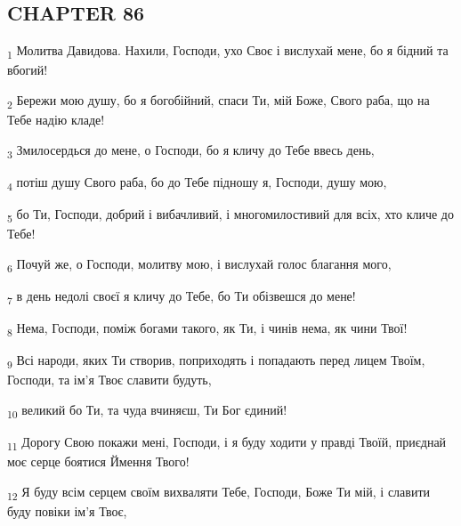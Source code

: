 \subsection{CHAPTER 86}
\begin{tcolorbox}
\textsubscript{1} Молитва Давидова. Нахили, Господи, ухо Своє і вислухай мене, бо я бідний та вбогий!
\end{tcolorbox}
\begin{tcolorbox}
\textsubscript{2} Бережи мою душу, бо я богобійний, спаси Ти, мій Боже, Свого раба, що на Тебе надію кладе!
\end{tcolorbox}
\begin{tcolorbox}
\textsubscript{3} Змилосердься до мене, о Господи, бо я кличу до Тебе ввесь день,
\end{tcolorbox}
\begin{tcolorbox}
\textsubscript{4} потіш душу Свого раба, бо до Тебе підношу я, Господи, душу мою,
\end{tcolorbox}
\begin{tcolorbox}
\textsubscript{5} бо Ти, Господи, добрий і вибачливий, і многомилостивий для всіх, хто кличе до Тебе!
\end{tcolorbox}
\begin{tcolorbox}
\textsubscript{6} Почуй же, о Господи, молитву мою, і вислухай голос благання мого,
\end{tcolorbox}
\begin{tcolorbox}
\textsubscript{7} в день недолі своєї я кличу до Тебе, бо Ти обізвешся до мене!
\end{tcolorbox}
\begin{tcolorbox}
\textsubscript{8} Нема, Господи, поміж богами такого, як Ти, і чинів нема, як чини Твої!
\end{tcolorbox}
\begin{tcolorbox}
\textsubscript{9} Всі народи, яких Ти створив, поприходять і попадають перед лицем Твоїм, Господи, та ім'я Твоє славити будуть,
\end{tcolorbox}
\begin{tcolorbox}
\textsubscript{10} великий бо Ти, та чуда вчиняєш, Ти Бог єдиний!
\end{tcolorbox}
\begin{tcolorbox}
\textsubscript{11} Дорогу Свою покажи мені, Господи, і я буду ходити у правді Твоїй, приєднай моє серце боятися Ймення Твого!
\end{tcolorbox}
\begin{tcolorbox}
\textsubscript{12} Я буду всім серцем своїм вихваляти Тебе, Господи, Боже Ти мій, і славити буду повіки ім'я Твоє,
\end{tcolorbox}
